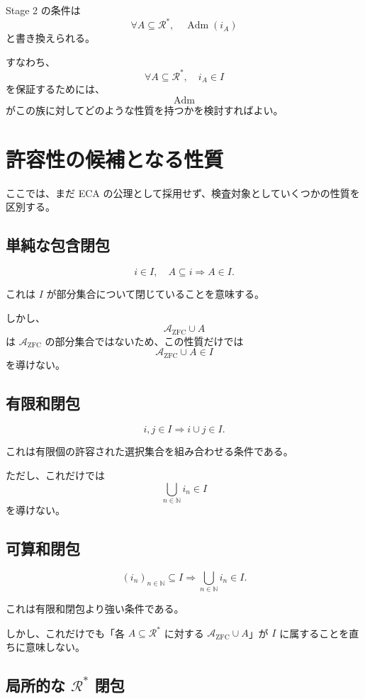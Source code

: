 \documentclass[a4paper,11pt]{ltjsarticle}
\begin{document}
Stage 2 の条件は
\[
\boxed{
\forall A\subseteq\mathcal{R}^*,
\quad
\operatorname{Adm}(i_A)
}
\]
と書き換えられる。

すなわち、
\[
\forall A\subseteq\mathcal{R}^*,
\quad
i_A\in I
\]
を保証するためには、
\[
\operatorname{Adm}
\]
がこの族に対してどのような性質を持つかを検討すればよい。

\section{許容性の候補となる性質}

ここでは、まだ ECA の公理として採用せず、検査対象としていくつかの性質を区別する。

\subsection{単純な包含閉包}

\[
i\in I,\quad A\subseteq i
\Longrightarrow
A\in I.
\]

これは $I$ が部分集合について閉じていることを意味する。

しかし、
\[
\mathcal{A}_{\mathrm{ZFC}}\cup A
\]
は $\mathcal{A}_{\mathrm{ZFC}}$ の部分集合ではないため、この性質だけでは
\[
\mathcal{A}_{\mathrm{ZFC}}\cup A\in I
\]
を導けない。

\subsection{有限和閉包}

\[
i,j\in I
\Longrightarrow
i\cup j\in I.
\]

これは有限個の許容された選択集合を組み合わせる条件である。

ただし、これだけでは
\[
\bigcup_{n\in\mathbb N}i_n\in I
\]
を導けない。

\subsection{可算和閉包}

\[
(i_n)_{n\in\mathbb N}\subseteq I
\Longrightarrow
\bigcup_{n\in\mathbb N}i_n\in I.
\]

これは有限和閉包より強い条件である。

しかし、これだけでも「各 $A\subseteq\mathcal{R}^*$ に対する
$\mathcal{A}_{\mathrm{ZFC}}\cup A$」が $I$ に属することを直ちに意味しない。

\subsection{局所的な $\mathcal{R}^*$ 閉包}
\end{document}
